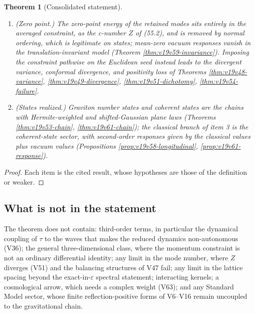 \documentclass[11pt]{article}
\newtheorem{theorem}{Theorem}[section]
\theoremstyle{remark}
\begin{document}
\begin{theorem}[Consolidated statement]
\begin{enumerate}
      induced physical space is the two-branch sum of Theorem
      \ref{thm:v19v62-branches}, with sectors labelled by graviton
      number and mean curvature \(\pm\tau_e\), \(\tfrac23\tau_e^2=e+2\Lambda\);
      the sector \(e+2\Lambda=0\) is singular and contains the classical
      time-symmetric slice (Theorems \ref{thm:v19v52-induced},
      \ref{thm:v19v61-sectors}).  Every real plane state weighs the two
      branches equally (Theorem \ref{thm:v19v63-symmetry}).
\item \textup{(Zero point.)}  The zero-point energy of the retained modes
      sits entirely in the averaged constraint, as the c-number
      \(Z\) of (55.2), and is removed by normal ordering, which is
      legitimate on states; mean-zero vacuum responses vanish in the
      translation-invariant model (Theorem \ref{thm:v19v59-invariance}).
      Imposing the constraint pathwise on the Euclidean seed instead
      leads to the divergent variance, conformal divergence, and
      positivity loss of Theorems \ref{thm:v19v48-variance},
      \ref{thm:v19v49-divergence}, \ref{thm:v19v51-dichotomy},
      \ref{thm:v19v54-failure}.
\item \textup{(States realized.)}  Graviton number states and coherent
      states are the chains with Hermite-weighted and shifted-Gaussian
      plane laws (Theorems \ref{thm:v19v53-chain},
      \ref{thm:v19v61-chain}); the classical branch of item 3 is the
      coherent-state sector, with second-order responses given by the
      classical values plus vacuum values (Propositions
      \ref{prop:v19v58-longitudinal}, \ref{prop:v19v61-response}).
\end{enumerate}
\end{theorem}

\begin{proof}
Each item is the cited result, whose hypotheses are those of the
definition or weaker.
\end{proof}

\subsection{What is not in the statement}

The theorem does not contain: third-order terms, in particular the
dynamical coupling of \(\tau\) to the waves that makes the reduced
dynamics non-autonomous (V36); the general three-dimensional class,
where the momentum constraint is not an ordinary differential
identity; any limit in the mode number, where \(Z\) diverges (V51) and
the balancing structures of V47 fail; any limit in the lattice spacing
beyond the exact-in-\(\varepsilon\) spectral statement; interacting
kernels; a cosmological arrow, which needs a complex weight (V63);
and any Standard Model sector, whose finite reflection-positive forms
of V6--V16 remain uncoupled to the gravitational chain.
\end{document}

